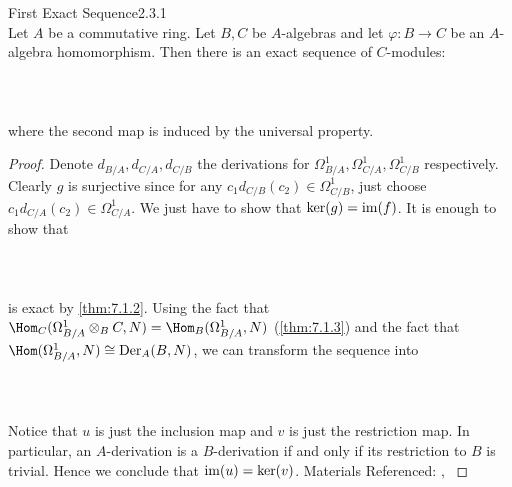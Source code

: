 \documentclass[a4paper]{article}
\begin{document}
\begin{thm}{First Exact Sequence}{2.3.1}\\
Let $A$ be a commutative ring. Let $B,C$ be $A$-algebras and let $\varphi:B\to C$ be an $A$-algebra homomorphism. Then there is an exact sequence of $C$-modules: \\~\\
 \\~\\
where the second map is induced by the universal property. 
\begin{proof}
Denote $d_{B/A},d_{C/A},d_{C/B}$ the derivations for $\Omega_{B/A}^1,\Omega_{C/A}^1,\Omega_{C/B}^1$ respectively. Clearly $g$ is surjective since for any $c_1d_{C/B}(c_2)\in\Omega_{C/B}^1$, just choose $c_1d_{C/A}(c_2)\in\Omega_{C/A}^1$. We just have to show that $\ker(g)=\operatorname{im}(f)$. It is enough to show that \\~\\
\\~\\
is exact by \ref{thm:7.1.2}. Using the fact that $\Hom_C(\Omega_{B/A}^1\otimes_BC,N)=\Hom_B(\Omega_{B/A}^1,N)$ (\ref{thm:7.1.3}) and the fact that $\Hom(\Omega_{B/A}^1,N)\cong\text{Der}_A(B,N)$, we can transform the sequence into \\~\\
\\~\\
Notice that $u$ is just the inclusion map and $v$ is just the restriction map. In particular, an $A$-derivation is a $B$-derivation if and only if its restriction to $B$ is trivial. Hence we conclude that $\operatorname{im}(u)=\ker(v)$. 
Materials Referenced: \cite{Liu}, \cite{CRing}
\end{proof}
\end{thm}
\end{document}
